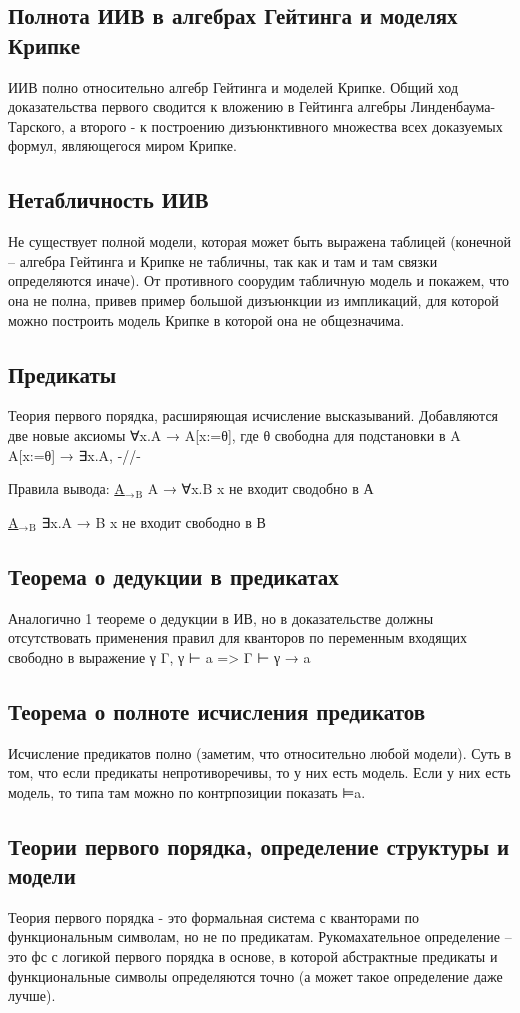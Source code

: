 \documentclass[11pt]{article}
\begin{document}
\subsection{Полнота ИИВ в алгебрах Гейтинга и моделях Крипке}
\label{sec-2-13}
ИИВ полно относительно алгебр Гейтинга и моделей Крипке.
Общий ход доказательства первого сводится к вложению
в Гейтинга алгебры Линденбаума-Тарского, а второго -
к построению дизъюнктивного множества всех доказуемых
формул, являющегося миром Крипке.
\subsection{Нетабличность ИИВ}
\label{sec-2-14}
Не существует полной модели, которая может быть выражена таблицей
(конечной – алгебра Гейтинга и Крипке не табличны, так как и там и
там связки определяются иначе).
От противного соорудим табличную модель и покажем, что она не полна,
привев пример большой дизъюнкции из импликаций, для которой можно
построить модель Крипке в которой она не общезначима.
\subsection{Предикаты}
\label{sec-2-15}
Теория первого порядка, расширяющая исчисление высказываний.
Добавляются две новые аксиомы
∀x.A → A[x:=θ], где θ свободна для подстановки в A
A[x:=θ] → ∃x.A, -//-

Правила вывода:
\uline{A$_{\text{→}}$$_{\text{B}}$}
A → ∀x.B        x не входит сводобно в А

\uline{A$_{\text{→}}$$_{\text{B}}$}
∃x.A → B        x не входит свободно в В
\subsection{Теорема о дедукции в предикатах}
\label{sec-2-16}
Аналогично 1 теореме о дедукции в ИВ, но в доказательстве должны
отсутствовать применения правил для кванторов по переменным входящих
свободно в выражение γ
Γ, γ ⊢ a => Γ ⊢ γ → a
\subsection{Теорема о полноте исчисления предикатов}
\label{sec-2-17}
Исчисление предикатов полно (заметим, что относительно любой модели).
Суть в том, что если предикаты непротиворечивы, то у них есть модель.
Если у них есть модель, то типа там можно по контрпозиции показать ⊨a.
\subsection{Теории первого порядка, определение структуры и модели}
\label{sec-2-18}
Теория первого порядка - это формальная система с кванторами по
функциональным символам, но не по предикатам. Рукомахательное
определение – это фс с логикой первого порядка в основе, в которой
абстрактные предикаты и функциональные символы определяются точно
(а может такое определение даже лучше).
\end{document}
